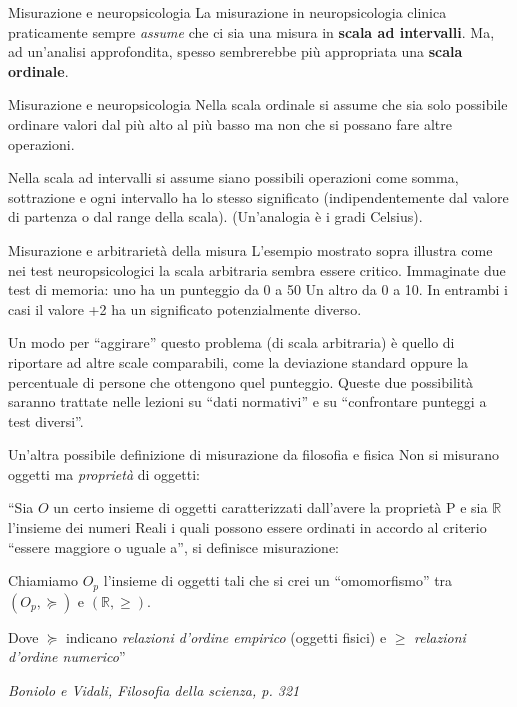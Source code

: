 \documentclass[
  ignorenonframetext,
]{beamer}
\begin{document}
\begin{frame}{Misurazione e neuropsicologia}
\label{misurazione-e-neuropsicologia}
La misurazione in neuropsicologia clinica praticamente sempre
\emph{assume} che ci sia una misura in \textbf{scala ad intervalli}. Ma,
ad un'analisi approfondita, spesso sembrerebbe più appropriata una
\textbf{scala ordinale}.
\end{frame}

\begin{frame}{Misurazione e neuropsicologia}
\label{misurazione-e-neuropsicologia-1}
Nella scala ordinale si assume che sia solo possibile ordinare valori
dal più alto al più basso ma non che si possano fare altre operazioni.

Nella scala ad intervalli si assume siano possibili operazioni come
somma, sottrazione e ogni intervallo ha lo stesso significato
(indipendentemente dal valore di partenza o dal range della scala).
(Un'analogia è i gradi Celsius).
\end{frame}

\begin{frame}{Misurazione e arbitrarietà della misura}
\label{misurazione-e-arbitrarietuxe0-della-misura}
L'esempio mostrato sopra illustra come nei test neuropsicologici la
scala arbitraria sembra essere critico. Immaginate due test di memoria:
uno ha un punteggio da 0 a 50 Un altro da 0 a 10. In entrambi i casi il
valore +2 ha un significato potenzialmente diverso.

Un modo per ``aggirare'' questo problema (di scala arbitraria) è quello
di riportare ad altre scale comparabili, come la deviazione standard
oppure la percentuale di persone che ottengono quel punteggio. Queste
due possibilità saranno trattate nelle lezioni su ``dati normativi'' e
su ``confrontare punteggi a test diversi''.
\end{frame}

\begin{frame}{Un'altra possibile definizione di misurazione da filosofia
e fisica}
\label{unaltra-possibile-definizione-di-misurazione-da-filosofia-e-fisica}
Non si misurano oggetti ma \emph{proprietà} di oggetti:

``Sia \(O\) un certo insieme di oggetti caratterizzati dall'avere la
proprietà P e sia \(\mathbb{R}\) l'insieme dei numeri Reali i quali
possono essere ordinati in accordo al criterio ``essere maggiore o
uguale a'', si definisce misurazione:

Chiamiamo \(O_p\) l'insieme di oggetti tali che si crei un
``omomorfismo'' tra \((O_p, \succcurlyeq)\) e \((\mathbb{R}, \geq)\).

Dove \(\succcurlyeq\) indicano \emph{relazioni d’ordine empirico}
(oggetti fisici) e \(\geq\) \emph{relazioni d’ordine numerico}''

\begin{flushright}
\emph{Boniolo e Vidali, Filosofia della scienza, p. 321}
\end{flushright}
\end{frame}
\end{document}
